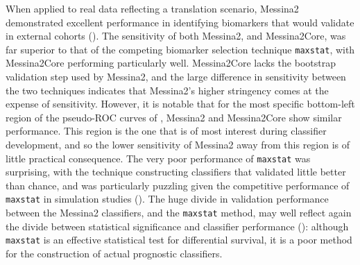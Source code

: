 \documentclass[dissertation.tex]{subfiles}
\begin{document}
When applied to real data reflecting a translation scenario, Messina2 demonstrated excellent performance in identifying biomarkers that would validate in external cohorts ().  The sensitivity of both Messina2, and Messina2Core, was far superior to that of the competing biomarker selection technique \texttt{maxstat}, with Messina2Core performing particularly well.  Messina2Core lacks the bootstrap validation step used by Messina2, and the large difference in sensitivity between the two techniques indicates that Messina2's higher stringency comes at the expense of sensitivity.  However, it is notable that for the most specific bottom-left region of the pseudo-\gls{ROC} curves of , Messina2 and Messina2Core show similar performance.  This region is the one that is of most interest during classifier development, and so the lower sensitivity of Messina2 away from this region is of little practical consequence.  The very poor performance of \texttt{maxstat} was surprising, with the technique constructing classifiers that validated little better than chance, and was particularly puzzling given the competitive performance of \texttt{maxstat} in simulation studies ().  The huge divide in validation performance between the Messina2 classifiers, and the \texttt{maxstat} method, may well reflect again the divide between statistical significance and classifier performance (): although \texttt{maxstat} is an effective statistical test for differential survival, it is a poor method for the construction of actual prognostic classifiers.
\end{document}
